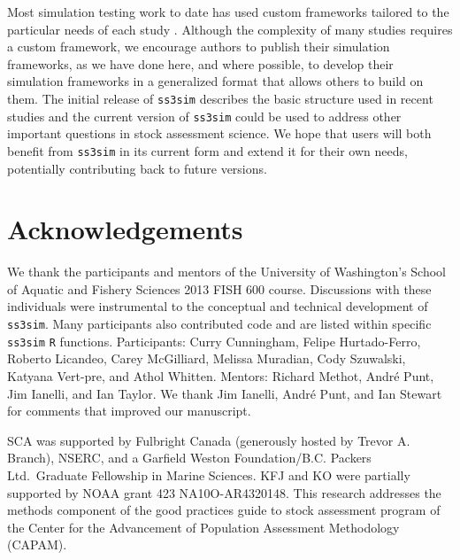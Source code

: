 \documentclass[12pt]{article}
\begin{document}
Most simulation testing work to date has used custom frameworks tailored to the particular needs of each study \cite{helu2000, yin2004, magnusson2007, wetzel2011a, jiao2012, wilberg2006, deroba2013a, deroba2013, crone2013a, hurtadoferro2013}. Although the complexity of many studies requires a custom framework, we encourage authors to publish their simulation frameworks, as we have done here, and where possible, to develop their simulation frameworks in a generalized format that allows others to build on them. The initial release of \texttt{ss3sim} describes the basic structure used in recent studies \cite{johnson2013, ono2013} and the current version of \texttt{ss3sim} could be used to address other important questions in stock assessment science. We hope that users will both benefit from \texttt{ss3sim} in its current form and extend it for their own needs, potentially contributing back to future versions.

\section*{Acknowledgements}

We thank the participants and mentors of the University of Washington's School of Aquatic and Fishery Sciences 2013 FISH 600 course. Discussions with these individuals were instrumental to the conceptual and technical development of \texttt{ss3sim}. Many participants also contributed code and are listed within specific \texttt{ss3sim} \texttt{R} functions. Participants: Curry Cunningham, Felipe Hurtado-Ferro, Roberto Licandeo, Carey McGilliard, Melissa Muradian, Cody Szuwalski, Katyana Vert-pre, and Athol Whitten. Mentors: Richard Methot, Andr\'{e} Punt, Jim Ianelli, and Ian Taylor. We thank Jim Ianelli, Andr\'{e} Punt, and Ian Stewart for comments that improved our manuscript.

SCA was supported by Fulbright Canada (generously hosted by Trevor A. Branch), NSERC, and a Garfield Weston Foundation/B.C. Packers Ltd.~Graduate Fellowship in Marine Sciences. KFJ and KO were partially supported by NOAA grant 423 NA10O-AR4320148. This research addresses the methods component of the good practices guide to stock assessment program of the Center for the Advancement of Population Assessment Methodology (CAPAM).
\end{document}
